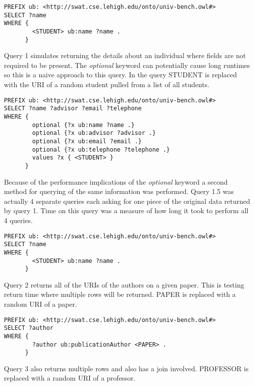 \documentclass{llncs}
\begin{document}
\begin{lstlisting}[caption=Benchmark Query]
PREFIX ub: <http://swat.cse.lehigh.edu/onto/univ-bench.owl#>
SELECT ?name
WHERE {
        <STUDENT> ub:name ?name .
      }
\end{lstlisting}

\smallskip

Query 1 simulates returning the details about an individual where fields are not required to be present.  The \emph{optional} keyword can potentially cause long runtimes so this is a naive approach to this query.  In the query STUDENT is replaced with the URI of a random student pulled from a list of all students.

\begin{lstlisting}[caption=Query 1]
PREFIX ub: <http://swat.cse.lehigh.edu/onto/univ-bench.owl#>
SELECT ?name ?advisor ?email ?telephone
WHERE {
        optional {?x ub:name ?name .}
        optional {?x ub:advisor ?advisor .}
        optional {?x ub:email ?email .}
        optional {?x ub:telephone ?telephone .}
        values ?x { <STUDENT> }
      }
\end{lstlisting}

\smallskip

Because of the performance implications of the \emph{optional} keyword a second method for querying of the same information was performed.  Query 1.5 was actually 4 separate queries each asking for one piece of the original data returned by query 1.  Time on this query was a measure of how long it took to perform all 4 queries.

\begin{lstlisting}[caption=Sample of Query 1.5]
PREFIX ub: <http://swat.cse.lehigh.edu/onto/univ-bench.owl#>
SELECT ?name
WHERE {
        <STUDENT> ub:name ?name .
      }
\end{lstlisting}

\smallskip

Query 2 returns all of the URIs of the authors on a given paper.  This is testing return time where multiple rows will be returned.  PAPER is replaced with a random URI of a paper.

\begin{lstlisting}[caption=Query 2]
PREFIX ub: <http://swat.cse.lehigh.edu/onto/univ-bench.owl#>
SELECT ?author
WHERE {
        ?author ub:publicationAuthor <PAPER> .
      }
\end{lstlisting}
\smallskip

Query 3 also returns multiple rows and also has a join involved.  PROFESSOR is replaced with a random URI of a professor.
\end{document}
